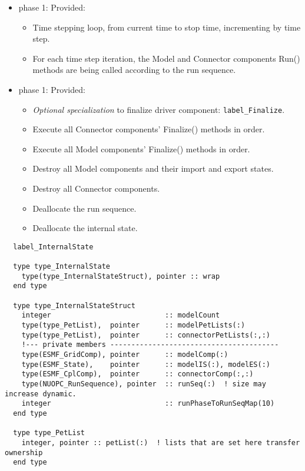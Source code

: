 \begin{itemize}
\item phase 1: {\sc Provided:}
  \begin{itemize}
  \item Time stepping loop, from current time to stop time, incrementing by time step.
  \item For each time step iteration, the Model and Connector components Run() methods are being called according to the run sequence.
  \end{itemize}    
\end{itemize}

\begin{itemize}
\item phase 1: {\sc Provided:}
  \begin{itemize}
  \item {\it Optional specialization} to finalize driver component: {\tt label\_Finalize}.
  \item Execute all Connector components' Finalize() methods in order.
  \item Execute all Model components' Finalize() methods in order.
  \item Destroy all Model components and their import and export states.
  \item Destroy all Connector components.
  \item Deallocate the run sequence.
  \item Deallocate the internal state.
  \end{itemize}      
\end{itemize}

\begin{verbatim}  label_InternalState

  type type_InternalState
    type(type_InternalStateStruct), pointer :: wrap
  end type

  type type_InternalStateStruct
    integer                           :: modelCount
    type(type_PetList),  pointer      :: modelPetLists(:)
    type(type_PetList),  pointer      :: connectorPetLists(:,:)
    !--- private members ----------------------------------------
    type(ESMF_GridComp), pointer      :: modelComp(:)
    type(ESMF_State),    pointer      :: modelIS(:), modelES(:)
    type(ESMF_CplComp),  pointer      :: connectorComp(:,:)
    type(NUOPC_RunSequence), pointer  :: runSeq(:)  ! size may increase dynamic.
    integer                           :: runPhaseToRunSeqMap(10)
  end type

  type type_PetList
    integer, pointer :: petList(:)  ! lists that are set here transfer ownership
  end type
  
\end{verbatim}

